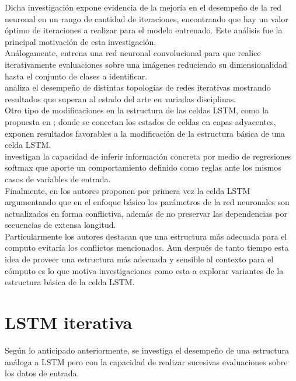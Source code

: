 \documentclass{article}
\begin{document}
Dicha investigación expone evidencia de la mejoría en el desempeño de la red neuronal en un rango de  cantidad de iteraciones, encontrando que hay un valor óptimo de iteraciones a realizar para el modelo entrenado. Este análisis fue la principal motivación de esta investigación.\\


Análogamente, \cite{sceneLabeling} entrena una red neuronal convolucional para que realice iterativamente evaluaciones sobre una imágenes reduciendo su dimensionalidad hasta el conjunto de clases a identificar.\\


\cite{loopyRNN} analiza el desempeño de distintas topologías de redes iterativas mostrando resultados que superan al estado del arte en variadas disciplinas.\\


Otro tipo de modificaciones en la estructura de las celdas LSTM, como la propuesta en \cite{depthLSTM}; donde se conectan los estados de celdas en capas adyacentes, exponen resultados favorables a la modificación de la estructura básica de una celda LSTM.\\


\cite{wideLearning} investigan la capacidad de inferir información concreta por medio de regresiones softmax que aporte un comportamiento definido como reglas ante los mismos casos de variables de entrada.\\


Finalmente, en \cite{LSTM} los autores proponen por primera vez la celda LSTM argumentando que en el enfoque básico los parámetros de la red neuronales son actualizados en forma conflictiva, además de no preservar las dependencias por secuencias de extensa longitud.\\


Particularmente los autores destacan que una estructura más adecuada para el computo evitaría los conflictos mencionados. Aun después de tanto tiempo esta idea de proveer una estructura más adecuada y sensible al contexto para el cómputo es lo que motiva investigaciones como esta a explorar variantes de la estructura básica de la celda LSTM.


\section{LSTM iterativa}


Según lo anticipado anteriormente, se investiga el desempeño de una estructura análoga a LSTM pero con la capacidad de realizar sucesivas evaluaciones sobre los datos de entrada.\\
\end{document}
